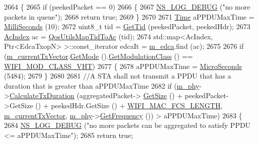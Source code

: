\begin{DoxyCode}
2664 \{
2665   \textcolor{keywordflow}{if} (peekedPacket == 0)
2666     \{
2667       \hyperlink{group__logging_ga413f1886406d49f59a6a0a89b77b4d0a}{NS\_LOG\_DEBUG} (\textcolor{stringliteral}{"no more packets in queue"});
2668       \textcolor{keywordflow}{return} \textcolor{keyword}{true};
2669     \}
2670 
2671   \hyperlink{namespacens3_1_1TracedValueCallback_a7ffd3e7c142ffe7c8a1d2db9b8de38ec}{Time} aPPDUMaxTime = \hyperlink{group__timecivil_gaf26127cf4571146b83a92ee18679c7a9}{MilliSeconds} (10);
2672   uint8\_t tid = \hyperlink{group__wifi_ga92cc18e2c5aa6bed3728860bbad76ff8}{GetTid} (peekedPacket, peekedHdr);
2673   \hyperlink{group__wifi_gab422b4562ba272b39a9b6bca3513f3ac}{AcIndex} ac = \hyperlink{group__wifi_ga4e36efcff6dd83eaee42e1af0de43d48}{QosUtilsMapTidToAc} (tid);
2674   std::map<AcIndex, Ptr<EdcaTxopN> >::const\_iterator edcaIt = \hyperlink{classns3_1_1MacLow_a754751ba4152c9337611a5f015045a44}{m\_edca}.find (ac);
2675 
2676   \textcolor{keywordflow}{if} (\hyperlink{classns3_1_1MacLow_af87bd81ded4d362f9f1dc89dbbee65a3}{m\_currentTxVector}.\hyperlink{classns3_1_1WifiTxVector_a497b1f11cad4b8b26251dfa07c9ad1d6}{GetMode} ().\hyperlink{classns3_1_1WifiMode_a7941cd2a0bc8d2ba68ba6a12c7e2c42a}{GetModulationClass} () == 
      \hyperlink{namespacens3_aa999e1221606a2b21b1eb33c2007c217a9863e4342bf5c238c74dddfc4d96c67e}{WIFI\_MOD\_CLASS\_VHT})
2677     \{
2678       aPPDUMaxTime = \hyperlink{group__timecivil_ga17465a639c8d1464e76538afdd78a9f0}{MicroSeconds} (5484);
2679     \}
2680 
2681   \textcolor{comment}{//A STA shall not transmit a PPDU that has a duration that is greater than aPPDUMaxTime}
2682   \textcolor{keywordflow}{if} (\hyperlink{classns3_1_1MacLow_aec8aefec9501f9d7c06b6cd0ee1353ee}{m\_phy}->\hyperlink{classns3_1_1WifiPhy_aee98c7241bb4f0bb8e6d90f5771dacc7}{CalculateTxDuration} (aggregatedPacket->
      \hyperlink{classns3_1_1Packet_a462855c9929954d4301a4edfe55f4f1c}{GetSize} () + peekedPacket->GetSize () + peekedHdr.GetSize () + 
      \hyperlink{namespacens3_a29f18a113e117817e22278a743437c08}{WIFI\_MAC\_FCS\_LENGTH}, \hyperlink{classns3_1_1MacLow_af87bd81ded4d362f9f1dc89dbbee65a3}{m\_currentTxVector}, 
      \hyperlink{classns3_1_1MacLow_aec8aefec9501f9d7c06b6cd0ee1353ee}{m\_phy}->\hyperlink{classns3_1_1WifiPhy_ad2508d94faf22d690d6b8b4367934fd1}{GetFrequency} ()) > aPPDUMaxTime)
2683     \{
2684       \hyperlink{group__logging_ga413f1886406d49f59a6a0a89b77b4d0a}{NS\_LOG\_DEBUG} (\textcolor{stringliteral}{"no more packets can be aggregated to satisfy PPDU <= aPPDUMaxTime"});
2685       \textcolor{keywordflow}{return} \textcolor{keyword}{true};

\end{DoxyCode}
